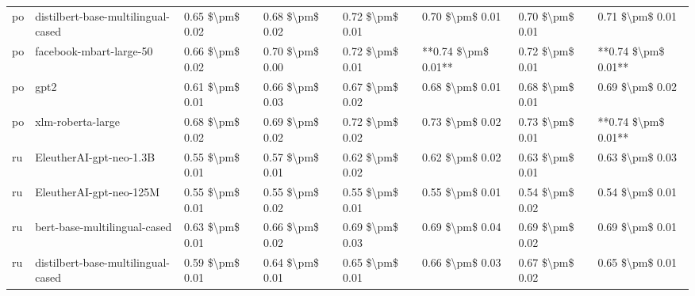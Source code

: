\begin{tabular}{llllllll}
      po & distilbert-base-multilingual-cased & 0.65 \$\textbackslash pm\$ 0.02 &           0.68 \$\textbackslash pm\$ 0.02 &       0.72 \$\textbackslash pm\$ 0.01 &        0.70 \$\textbackslash pm\$ 0.01 &                         0.70 \$\textbackslash pm\$ 0.01 &     0.71 \$\textbackslash pm\$ 0.01 \\
      po &            facebook-mbart-large-50 & 0.66 \$\textbackslash pm\$ 0.02 &           0.70 \$\textbackslash pm\$ 0.00 &       0.72 \$\textbackslash pm\$ 0.01 &    **0.74 \$\textbackslash pm\$ 0.01** &                         0.72 \$\textbackslash pm\$ 0.01 & **0.74 \$\textbackslash pm\$ 0.01** \\
      po &                               gpt2 & 0.61 \$\textbackslash pm\$ 0.01 &           0.66 \$\textbackslash pm\$ 0.03 &       0.67 \$\textbackslash pm\$ 0.02 &        0.68 \$\textbackslash pm\$ 0.01 &                         0.68 \$\textbackslash pm\$ 0.01 &     0.69 \$\textbackslash pm\$ 0.02 \\
      po &                  xlm-roberta-large & 0.68 \$\textbackslash pm\$ 0.02 &           0.69 \$\textbackslash pm\$ 0.02 &       0.72 \$\textbackslash pm\$ 0.02 &        0.73 \$\textbackslash pm\$ 0.02 &                         0.73 \$\textbackslash pm\$ 0.01 & **0.74 \$\textbackslash pm\$ 0.01** \\
      ru &            EleutherAI-gpt-neo-1.3B & 0.55 \$\textbackslash pm\$ 0.01 &           0.57 \$\textbackslash pm\$ 0.01 &       0.62 \$\textbackslash pm\$ 0.02 &        0.62 \$\textbackslash pm\$ 0.02 &                         0.63 \$\textbackslash pm\$ 0.01 &     0.63 \$\textbackslash pm\$ 0.03 \\
      ru &            EleutherAI-gpt-neo-125M & 0.55 \$\textbackslash pm\$ 0.01 &           0.55 \$\textbackslash pm\$ 0.02 &       0.55 \$\textbackslash pm\$ 0.01 &        0.55 \$\textbackslash pm\$ 0.01 &                         0.54 \$\textbackslash pm\$ 0.02 &     0.54 \$\textbackslash pm\$ 0.01 \\
      ru &       bert-base-multilingual-cased & 0.63 \$\textbackslash pm\$ 0.01 &           0.66 \$\textbackslash pm\$ 0.02 &       0.69 \$\textbackslash pm\$ 0.03 &        0.69 \$\textbackslash pm\$ 0.04 &                         0.69 \$\textbackslash pm\$ 0.02 &     0.69 \$\textbackslash pm\$ 0.01 \\
      ru & distilbert-base-multilingual-cased & 0.59 \$\textbackslash pm\$ 0.01 &           0.64 \$\textbackslash pm\$ 0.01 &       0.65 \$\textbackslash pm\$ 0.01 &        0.66 \$\textbackslash pm\$ 0.03 &                         0.67 \$\textbackslash pm\$ 0.02 &     0.65 \$\textbackslash pm\$ 0.01 \\

\end{tabular}
